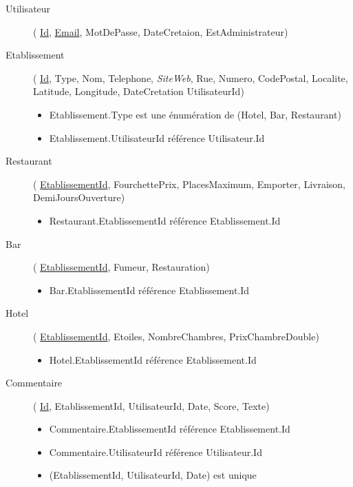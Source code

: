 \documentclass[10pt,a4paper]{article}
\begin{document}
\begin{description}
\item[Utilisateur](
    \underline{Id},
    \underline{Email},
    MotDePasse,
    DateCretaion,
    EstAdministrateur)

\item[Etablissement](
    \underline{Id},
    Type,
    Nom,
    Telephone,
    \textit{SiteWeb},
    Rue,
    Numero,
    CodePostal,
    Localite,
    Latitude,
    Longitude,
    DateCretation
    UtilisateurId)

    \begin{itemize}
        \item Etablissement.Type est une énumération de (Hotel, Bar, Restaurant)
        \item Etablissement.UtilisateurId référence Utilisateur.Id
    \end{itemize}

\item[Restaurant](
    \underline{EtablissementId},
    FourchettePrix,
    PlacesMaximum,
    Emporter,
    Livraison,
    DemiJoursOuverture)

    \begin{itemize}
        \item Restaurant.EtablissementId référence Etablissement.Id
    \end{itemize}

\item[Bar](
    \underline{EtablissementId},
    Fumeur,
    Restauration)

    \begin{itemize}
        \item Bar.EtablissementId référence Etablissement.Id
    \end{itemize}

\item[Hotel](
    \underline{EtablissementId},
    Etoiles,
    NombreChambres,
    PrixChambreDouble)

    \begin{itemize}
        \item Hotel.EtablissementId référence Etablissement.Id
    \end{itemize}

\item[Commentaire](
    \underline{Id},
    EtablissementId,
    UtilisateurId,
    Date,
    Score,
    Texte)

    \begin{itemize}
        \item Commentaire.EtablissementId référence Etablissement.Id
        \item Commentaire.UtilisateurId référence Utilisateur.Id
        \item (EtablissementId, UtilisateurId, Date) est unique
    \end{itemize}


\end{description}
\end{document}
